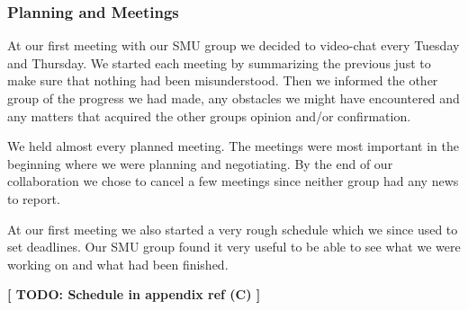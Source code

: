 \subsubsection{Planning and Meetings}
At our first meeting with our SMU group we decided to video-chat every Tuesday and Thursday. We started each meeting by summarizing the previous just to make sure that nothing had been misunderstood. Then we informed the other group of the progress we had made, any obstacles we might have encountered and any matters that acquired the other groups opinion and/or confirmation. 

We held almost every planned meeting. The meetings were most important in the beginning where we were planning and negotiating. By the end of our collaboration we chose to cancel a few meetings since neither group had any news to report.

At our first meeting we also started a very rough schedule which we since used to set deadlines. Our SMU group found it very useful to be able to see what we were working on and what had been finished.

\textbf{[ TODO: Schedule in appendix ref (C) ]}